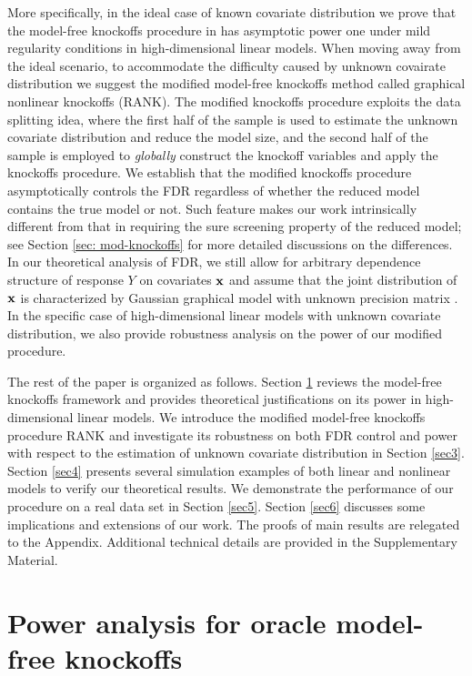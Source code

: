\documentclass[11pt]{article}
\newcommand{\bx}{\mbox{\bf x}}
\begin{document}
More specifically, in the ideal case of known covariate distribution we prove that the model-free knockoffs procedure in \cite{CandesFanJansonLv2016} has asymptotic power one under mild regularity conditions in high-dimensional linear models. When moving away from the ideal scenario,
to accommodate the difficulty caused by unknown covairate distribution we suggest the modified model-free knockoffs method called graphical nonlinear knockoffs (RANK). The modified knockoffs procedure exploits the data splitting idea, where the first half of the sample is used to estimate the unknown covariate distribution and reduce the model size, and the second half of the sample is employed to \textit{globally} construct the knockoff variables and apply the knockoffs procedure. We establish that the modified knockoffs procedure asymptotically controls the FDR regardless of whether the reduced model contains the true model or not. Such feature makes our work intrinsically different from that in \cite{BarberCandes2016} requiring the sure screening property \cite{FanLv2008} of the reduced model; see Section \ref{sec: mod-knockoffs} for more detailed discussions on the differences.
In our theoretical analysis of FDR, we still allow for arbitrary dependence structure of response $Y$ on covariates $\bx$ and assume that the joint distribution of $\bx$ is characterized by Gaussian graphical model with unknown precision matrix \cite{Lauritzen1996}. In the specific case of high-dimensional linear models with unknown covariate distribution, we also provide robustness analysis on the power of our modified procedure.

The rest of the paper is organized as follows. Section \ref{Sec2} reviews the model-free knockoffs framework and provides theoretical justifications on its power in high-dimensional linear models. We introduce the modified model-free knockoffs procedure RANK and investigate its robustness on both FDR control and power with respect to the estimation of unknown covariate distribution in Section \ref{sec3}. Section \ref{sec4} presents several simulation examples of both linear and nonlinear models to verify our theoretical results. We demonstrate the performance of our procedure on a real data set in Section \ref{sec5}. Section \ref{sec6} discusses some implications and extensions of our work. The proofs of main results are relegated to the Appendix. Additional technical details are provided in the Supplementary Material.


\section{Power analysis for oracle model-free knockoffs} \label{Sec2}
\end{document}

